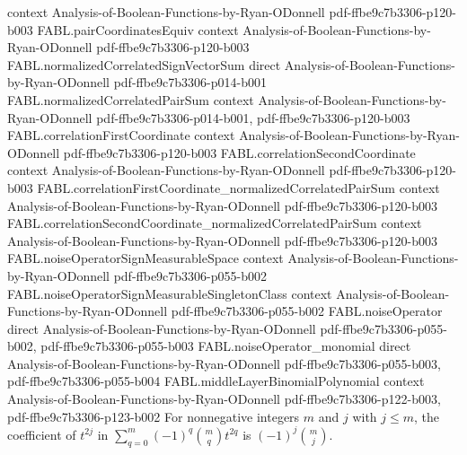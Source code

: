 \begin{theorem}
  {context}
  {Analysis-of-Boolean-Functions-by-Ryan-ODonnell}
  {pdf-ffbe9c7b3306-p120-b003}
\proofstep
  {FABL.pairCoordinatesEquiv}
  {context}
  {Analysis-of-Boolean-Functions-by-Ryan-ODonnell}
  {pdf-ffbe9c7b3306-p120-b003}
\proofstep
  {FABL.normalizedCorrelatedSignVectorSum}
  {direct}
  {Analysis-of-Boolean-Functions-by-Ryan-ODonnell}
  {pdf-ffbe9c7b3306-p014-b001}
\proofstep
  {FABL.normalizedCorrelatedPairSum}
  {context}
  {Analysis-of-Boolean-Functions-by-Ryan-ODonnell}
  {pdf-ffbe9c7b3306-p014-b001,
    pdf-ffbe9c7b3306-p120-b003}
\proofstep
  {FABL.correlationFirstCoordinate}
  {context}
  {Analysis-of-Boolean-Functions-by-Ryan-ODonnell}
  {pdf-ffbe9c7b3306-p120-b003}
\proofstep
  {FABL.correlationSecondCoordinate}
  {context}
  {Analysis-of-Boolean-Functions-by-Ryan-ODonnell}
  {pdf-ffbe9c7b3306-p120-b003}
\proofstep
  {FABL.correlationFirstCoordinate_normalizedCorrelatedPairSum}
  {context}
  {Analysis-of-Boolean-Functions-by-Ryan-ODonnell}
  {pdf-ffbe9c7b3306-p120-b003}
\proofstep
  {FABL.correlationSecondCoordinate_normalizedCorrelatedPairSum}
  {context}
  {Analysis-of-Boolean-Functions-by-Ryan-ODonnell}
  {pdf-ffbe9c7b3306-p120-b003}
\proofstep
  {FABL.noiseOperatorSignMeasurableSpace}
  {context}
  {Analysis-of-Boolean-Functions-by-Ryan-ODonnell}
  {pdf-ffbe9c7b3306-p055-b002}
\proofstep
  {FABL.noiseOperatorSignMeasurableSingletonClass}
  {context}
  {Analysis-of-Boolean-Functions-by-Ryan-ODonnell}
  {pdf-ffbe9c7b3306-p055-b002}
\proofstep
  {FABL.noiseOperator}
  {direct}
  {Analysis-of-Boolean-Functions-by-Ryan-ODonnell}
  {pdf-ffbe9c7b3306-p055-b002,
    pdf-ffbe9c7b3306-p055-b003}
\proofstep
  {FABL.noiseOperator_monomial}
  {direct}
  {Analysis-of-Boolean-Functions-by-Ryan-ODonnell}
  {pdf-ffbe9c7b3306-p055-b003,
    pdf-ffbe9c7b3306-p055-b004}
\proofstep
  {FABL.middleLayerBinomialPolynomial}
  {context}
  {Analysis-of-Boolean-Functions-by-Ryan-ODonnell}
  {pdf-ffbe9c7b3306-p122-b003,
    pdf-ffbe9c7b3306-p123-b002}
For nonnegative integers $m$ and $j$ with $j\le m$, the coefficient of $t^{2j}$ in
$\sum_{q=0}^{m}(-1)^q\binom{m}{q}t^{2q}$ is $(-1)^j\binom{m}{j}$.
\end{theorem}

